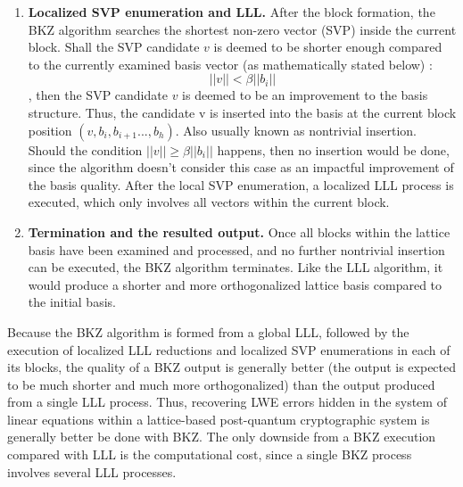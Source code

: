 \begin{enumerate}
    \item \textbf{Localized SVP enumeration and LLL.} After the block formation, the BKZ algorithm searches the shortest non-zero vector (SVP) inside the current block. Shall the SVP candidate $v$ is deemed to be shorter enough compared to the currently examined basis vector (as mathematically stated below) : $$||v|| < \beta||b_i||$$, then the SVP candidate $v$ is deemed to be an improvement to the basis structure. Thus, the candidate v is inserted into the basis at the current block position $(v,b_i,b_{i+1}...,b_h)$. Also usually known as nontrivial insertion. Should the condition $||v|| \ge \beta||b_i||$ happens, then no insertion would be done, since the algorithm doesn't consider this case as an impactful improvement of the basis quality. After the local SVP enumeration, a localized LLL process is executed, which only involves all vectors within the current block. 
    \item \textbf{Termination and the resulted output.} Once all blocks within the lattice basis have been examined and processed, and no further nontrivial insertion can be executed, the BKZ algorithm terminates. Like the LLL algorithm, it would produce a shorter and more orthogonalized lattice basis compared to the initial basis.
\end{enumerate}

Because the BKZ algorithm is formed from a global LLL, followed by the execution of localized LLL reductions and localized SVP enumerations in each of its blocks, the quality of a BKZ output is generally better (the output is expected to be much shorter and much more orthogonalized) than the output produced from a single LLL process. Thus, recovering LWE errors hidden in the system of linear equations within a lattice-based post-quantum cryptographic system is generally better be done with BKZ. The only downside from a BKZ execution compared with LLL is the computational cost, since a single BKZ process involves several LLL processes. 